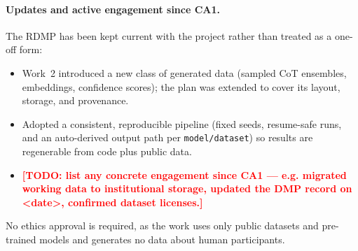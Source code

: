 \documentclass[11pt]{article}
\newcommand{\TODO}[1]{\textcolor{red}{\textbf{[TODO: #1]}}}
\begin{document}
\paragraph{Updates and active engagement since CA1.}
The RDMP has been kept current with the project rather than treated as a one-off form:
\begin{itemize}[itemsep=2pt]
  \item Work~2 introduced a new class of generated data (sampled CoT ensembles, embeddings,
  confidence scores); the plan was extended to cover its layout, storage, and provenance.
  \item Adopted a consistent, reproducible pipeline (fixed seeds, resume-safe runs, and an
  auto-derived output path per \texttt{model/dataset}) so results are regenerable from code plus
  public data.
  \item \TODO{list any concrete engagement since CA1 --- e.g. migrated working data to institutional
  storage, updated the DMP record on <date>, confirmed dataset licenses.}
\end{itemize}
No ethics approval is required, as the work uses only public datasets and pre-trained models and
generates no data about human participants.



\end{document}
